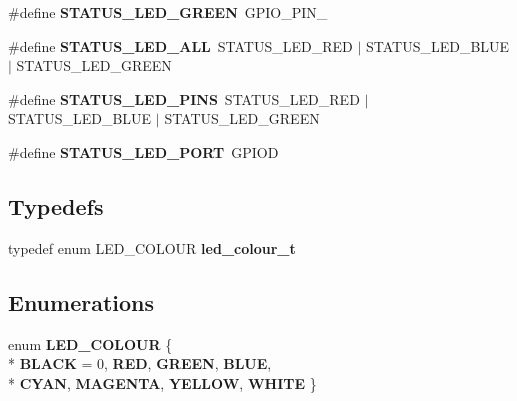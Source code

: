 \begin{DoxyCompactItemize}
\item 
\hypertarget{group__led_ga2a197b346bae52a8b1f7ad23e3d4954f}{}\#define {\bfseries S\+T\+A\+T\+U\+S\+\_\+\+L\+E\+D\+\_\+\+G\+R\+E\+E\+N}~G\+P\+I\+O\+\_\+\+P\+I\+N\+\_\label{group__led_ga2a197b346bae52a8b1f7ad23e3d4954f}

\item 
\hypertarget{group__led_ga2ee1d6e526dd16cf39236f900dc9a7aa}{}\#define {\bfseries S\+T\+A\+T\+U\+S\+\_\+\+L\+E\+D\+\_\+\+A\+L\+L}~S\+T\+A\+T\+U\+S\+\_\+\+L\+E\+D\+\_\+\+R\+E\+D $\vert$ S\+T\+A\+T\+U\+S\+\_\+\+L\+E\+D\+\_\+\+B\+L\+U\+E $\vert$ S\+T\+A\+T\+U\+S\+\_\+\+L\+E\+D\+\_\+\+G\+R\+E\+E\+N\label{group__led_ga2ee1d6e526dd16cf39236f900dc9a7aa}

\item 
\hypertarget{group__led_gaa47fbfe1959fa25fae60720ab89d70ed}{}\#define {\bfseries S\+T\+A\+T\+U\+S\+\_\+\+L\+E\+D\+\_\+\+P\+I\+N\+S}~S\+T\+A\+T\+U\+S\+\_\+\+L\+E\+D\+\_\+\+R\+E\+D $\vert$ S\+T\+A\+T\+U\+S\+\_\+\+L\+E\+D\+\_\+\+B\+L\+U\+E $\vert$ S\+T\+A\+T\+U\+S\+\_\+\+L\+E\+D\+\_\+\+G\+R\+E\+E\+N\label{group__led_gaa47fbfe1959fa25fae60720ab89d70ed}

\item 
\hypertarget{group__led_ga5b8353569a7ac1ec1f773fbd28495b43}{}\#define {\bfseries S\+T\+A\+T\+U\+S\+\_\+\+L\+E\+D\+\_\+\+P\+O\+R\+T}~G\+P\+I\+O\+D\label{group__led_ga5b8353569a7ac1ec1f773fbd28495b43}

\end{DoxyCompactItemize}
\subsection*{Typedefs}
\begin{DoxyCompactItemize}
\item 
\hypertarget{group__led_gae2a81cd4072ed5dcd1fd80b616f7d858}{}typedef enum L\+E\+D\+\_\+\+C\+O\+L\+O\+U\+R {\bfseries led\+\_\+colour\+\_\+t}\label{group__led_gae2a81cd4072ed5dcd1fd80b616f7d858}

\end{DoxyCompactItemize}
\subsection*{Enumerations}
\begin{DoxyCompactItemize}
\item 
\hypertarget{group__led_gaf27c986dbb25dab534e69e5aaf8fc540}{}enum {\bfseries L\+E\+D\+\_\+\+C\+O\+L\+O\+U\+R} \{ \\*
{\bfseries B\+L\+A\+C\+K} = 0, 
{\bfseries R\+E\+D}, 
{\bfseries G\+R\+E\+E\+N}, 
{\bfseries B\+L\+U\+E}, 
\\*
{\bfseries C\+Y\+A\+N}, 
{\bfseries M\+A\+G\+E\+N\+T\+A}, 
{\bfseries Y\+E\+L\+L\+O\+W}, 
{\bfseries W\+H\+I\+T\+E}
 \}\label{group__led_gaf27c986dbb25dab534e69e5aaf8fc540}

\end{DoxyCompactItemize}
